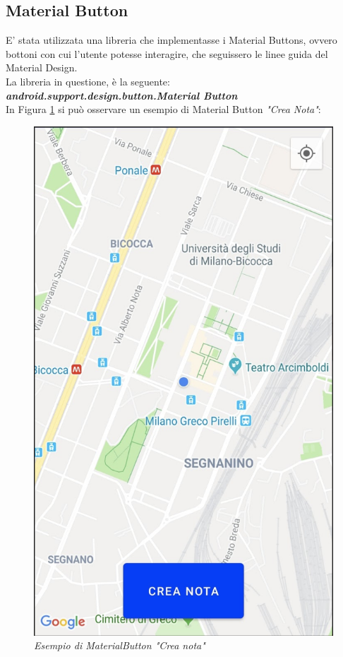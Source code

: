 \subsection{Material Button}
E' stata utilizzata una libreria che implementasse i Material Buttons, ovvero bottoni con cui l'utente potesse interagire, che seguissero le linee guida del Material Design.
\\La libreria in questione, è la seguente:
\textit{\textbf{android.support.design.button.Material Button}}
\\In Figura \ref{fig:MaterialButton} si può osservare un esempio di Material Button \textit{"Crea Nota"}:
\begin{figure}[!h]
    \centering
	\includegraphics[scale=0.35]{Tesi/images/MaterialButton}
	\caption{\textit{Esempio di MaterialButton "Crea nota"}}
	\label{fig:MaterialButton}
\end{figure}


